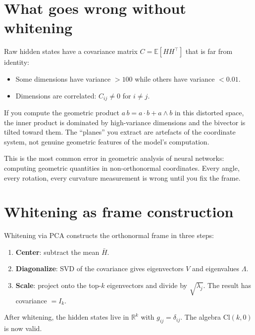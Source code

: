 \documentclass[11pt, twoside, openright]{memoir}
\newcommand{\gp}{\,}              %
\newcommand{\ip}{\cdot}           %
\newcommand{\op}{\wedge}          %
\numberwithin{equation}{chapter}
\begin{document}
\section{What goes wrong without whitening}

Raw hidden states have a covariance matrix $C = \mathbb{E}[HH^\top]$
that is far from identity:
\begin{itemize}[nosep]
\item Some dimensions have variance $>100$ while others have variance
  $<0.01$.
\item Dimensions are correlated: $C_{ij} \neq 0$ for $i \neq j$.
\end{itemize}

If you compute the geometric product $a \gp b = a \ip b + a \op b$ in
this distorted space, the inner product is dominated by high-variance
dimensions and the bivector is tilted toward them.  The ``planes'' you
extract are artefacts of the coordinate system, not genuine geometric
features of the model's computation.

\begin{pitfall}
This is the most common error in geometric analysis of neural networks:
computing geometric quantities in non-orthonormal coordinates.  Every
angle, every rotation, every curvature measurement is wrong until you
fix the frame.
\end{pitfall}

\section{Whitening as frame construction}

Whitening via PCA constructs the orthonormal frame in three steps:
\begin{enumerate}[nosep]
\item \textbf{Center}: subtract the mean $\bar{H}$.
\item \textbf{Diagonalize}: SVD of the covariance gives eigenvectors
  $V$ and eigenvalues $\Lambda$.
\item \textbf{Scale}: project onto the top-$k$ eigenvectors and divide
  by $\sqrt{\lambda_j}$.  The result has covariance $= I_k$.
\end{enumerate}

After whitening, the hidden states live in $\mathbb{R}^k$ with
$g_{ij} = \delta_{ij}$.  The algebra $\mathrm{Cl}(k, 0)$ is now valid.
\end{document}
